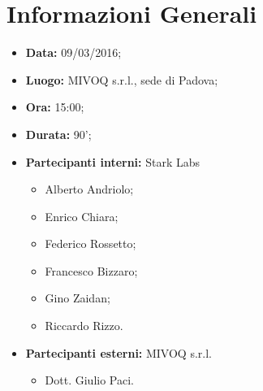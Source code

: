 \section{Informazioni Generali}

\begin{itemize}
\item \textbf{Data:} 09/03/2016;
\item \textbf{Luogo:} MIVOQ s.r.l., sede di Padova;
\item \textbf{Ora:} 15:00;
\item \textbf{Durata:} 90';
\item \textbf{Partecipanti interni:} Stark Labs
	\begin{itemize}
	\item Alberto Andriolo;
	\item Enrico Chiara;
	\item Federico Rossetto;
	\item Francesco Bizzaro;
	\item Gino Zaidan;
	\item Riccardo Rizzo.
	\end{itemize}
\item \textbf{Partecipanti esterni:} MIVOQ s.r.l.
	\begin{itemize}
	\item Dott. Giulio Paci.
	\end{itemize}
\end{itemize}










